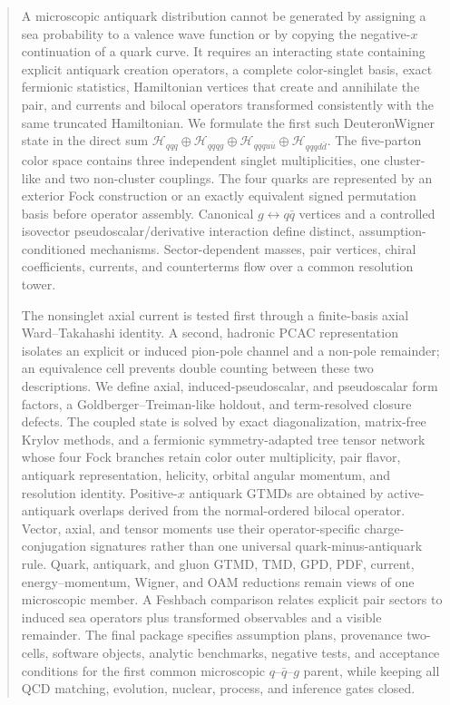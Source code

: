 \documentclass[11pt]{article}
\newcommand{\Hil}{\mathcal H}
\newcommand{\Hthree}{\Hil_{qqq}}
\newcommand{\Hfour}{\Hil_{qqqg}}
\newcommand{\Hfiveu}{\Hil_{qqqu\bar u}}
\newcommand{\Hfived}{\Hil_{qqqd\bar d}}
\begin{document}
\begin{abstract}
A microscopic antiquark distribution cannot be generated by assigning a sea
probability to a valence wave function or by copying the negative-\(x\)
continuation of a quark curve.  It requires an interacting state containing
explicit antiquark creation operators, a complete color-singlet basis, exact
fermionic statistics, Hamiltonian vertices that create and annihilate the
pair, and currents and bilocal operators transformed consistently with the
same truncated Hamiltonian.  We formulate the first such DeuteronWigner
state in the direct sum
\(\Hthree\oplus\Hfour\oplus\Hfiveu\oplus\Hfived\).  The five-parton color
space contains three independent singlet multiplicities, one cluster-like and
two non-cluster couplings.  The four quarks are represented by an exterior
Fock construction or an exactly equivalent signed permutation basis before
operator assembly.  Canonical \(g\leftrightarrow q\bar q\) vertices and a
controlled isovector pseudoscalar/derivative interaction define distinct,
assumption-conditioned mechanisms.  Sector-dependent masses, pair vertices,
chiral coefficients, currents, and counterterms flow over a common resolution
tower.

The nonsinglet axial current is tested first through a finite-basis axial
Ward--Takahashi identity.  A second, hadronic PCAC representation isolates an
explicit or induced pion-pole channel and a non-pole remainder; an equivalence
cell prevents double counting between these two descriptions.  We define
axial, induced-pseudoscalar, and pseudoscalar form factors, a
Goldberger--Treiman-like holdout, and term-resolved closure defects.  The
coupled state is solved by exact diagonalization, matrix-free Krylov methods,
and a fermionic symmetry-adapted tree tensor network whose four Fock branches
retain color outer multiplicity, pair flavor, antiquark representation,
helicity, orbital angular momentum, and resolution identity.  Positive-\(x\)
antiquark GTMDs are obtained by active-antiquark overlaps derived from the
normal-ordered bilocal operator.  Vector, axial, and tensor moments use their
operator-specific charge-conjugation signatures rather than one universal
quark-minus-antiquark rule.  Quark, antiquark, and gluon GTMD, TMD, GPD, PDF,
current, energy--momentum, Wigner, and OAM reductions remain views of one
microscopic member.  A Feshbach comparison relates explicit pair sectors to
induced sea operators plus transformed observables and a visible remainder.
The final package specifies assumption plans, provenance two-cells, software
objects, analytic benchmarks, negative tests, and acceptance conditions for
the first common microscopic \(q\)--\(\bar q\)--\(g\) parent, while keeping
all QCD matching, evolution, nuclear, process, and inference gates closed.
\end{abstract}
\end{document}
